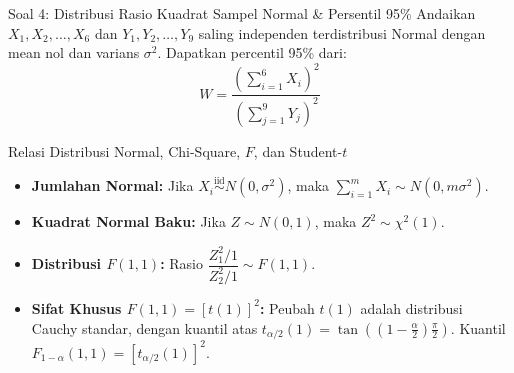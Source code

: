 \documentclass[10pt,twoside]{article}
\begin{document}
\begin{soalbox}{Soal 4: Distribusi Rasio Kuadrat Sampel Normal \& Persentil 95\%}
Andaikan $X_1, X_2, \dots, X_6$ dan $Y_1, Y_2, \dots, Y_9$ saling independen terdistribusi Normal dengan mean nol dan varians $\sigma^2$. Dapatkan percentil 95\% dari:
\[
W = \frac{\left(\sum_{i=1}^{6} X_i\right)^2}{\left(\sum_{j=1}^{9} Y_j\right)^2}
\]
\end{soalbox}

\begin{tipbox}{Relasi Distribusi Normal, Chi-Square, $F$, dan Student-$t$}
\begin{itemize}
  \item \textbf{Jumlahan Normal:} Jika $X_i \overset{\mathrm{iid}}{\sim} N(0, \sigma^2)$, maka $\sum_{i=1}^m X_i \sim N(0, m\sigma^2)$.
  \item \textbf{Kuadrat Normal Baku:} Jika $Z \sim N(0, 1)$, maka $Z^2 \sim \chi^2(1)$.
  \item \textbf{Distribusi $F(1, 1)$:} Rasio $\dfrac{Z_1^2 / 1}{Z_2^2 / 1} \sim F(1, 1)$.
  \item \textbf{Sifat Khusus $F(1, 1) = [t(1)]^2$:} Peubah $t(1)$ adalah distribusi Cauchy standar, dengan kuantil atas $t_{\alpha/2}(1) = \tan\left(\left(1 - \frac{\alpha}{2}\right)\frac{\pi}{2}\right)$. Kuantil $F_{1-\alpha}(1, 1) = \left[t_{\alpha/2}(1)\right]^2$.
\end{itemize}
\end{tipbox}
\end{document}
